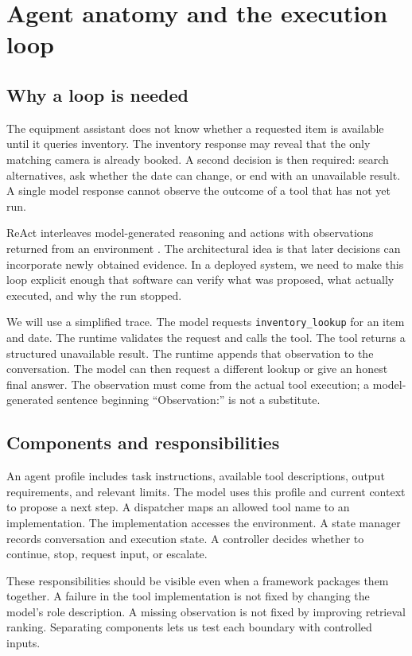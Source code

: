 \chapter{Agent anatomy and the execution loop}
\section{Why a loop is needed}
The equipment assistant does not know whether a requested item is available until it queries inventory. The inventory response may reveal that the only matching camera is already booked. A second decision is then required: search alternatives, ask whether the date can change, or end with an unavailable result. A single model response cannot observe the outcome of a tool that has not yet run.

ReAct interleaves model-generated reasoning and actions with observations returned from an environment \cite{react}. The architectural idea is that later decisions can incorporate newly obtained evidence. In a deployed system, we need to make this loop explicit enough that software can verify what was proposed, what actually executed, and why the run stopped.

We will use a simplified trace. The model requests \texttt{inventory\_lookup} for an item and date. The runtime validates the request and calls the tool. The tool returns a structured unavailable result. The runtime appends that observation to the conversation. The model can then request a different lookup or give an honest final answer. The observation must come from the actual tool execution; a model-generated sentence beginning “Observation:” is not a substitute.

\section{Components and responsibilities}
An agent profile includes task instructions, available tool descriptions, output requirements, and relevant limits. The model uses this profile and current context to propose a next step. A dispatcher maps an allowed tool name to an implementation. The implementation accesses the environment. A state manager records conversation and execution state. A controller decides whether to continue, stop, request input, or escalate.

These responsibilities should be visible even when a framework packages them together. A failure in the tool implementation is not fixed by changing the model's role description. A missing observation is not fixed by improving retrieval ranking. Separating components lets us test each boundary with controlled inputs.

